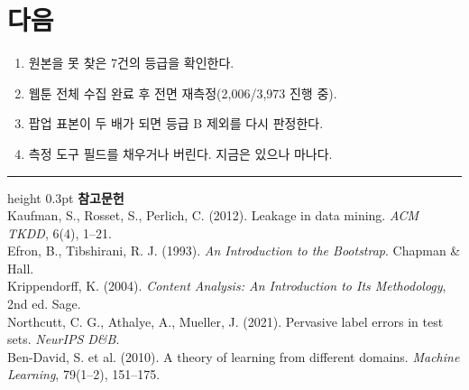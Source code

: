 \documentclass[10pt]{article}
\begin{document}
\section{다음}

\begin{enumerate}[leftmargin=1.3em,itemsep=0.15em]
\item 원본을 못 찾은 7건의 등급을 확인한다.
\item 웹툰 전체 수집 완료 후 전면 재측정(2,006/3,973 진행 중).
\item 팝업 표본이 두 배가 되면 등급 B 제외를 다시 판정한다.
\item 측정 도구 필드를 채우거나 버린다. 지금은 있으나 마나다.
\end{enumerate}

\vspace{0.6em}
\hrule height 0.3pt
\vspace{0.5em}
{\footnotesize
\textbf{참고문헌}\\[0.3em]
Kaufman, S., Rosset, S., Perlich, C. (2012). Leakage in data mining.
\emph{ACM TKDD}, 6(4), 1--21.\\[0.15em]
Efron, B., Tibshirani, R. J. (1993). \emph{An Introduction to the Bootstrap}.
Chapman \& Hall.\\[0.15em]
Krippendorff, K. (2004). \emph{Content Analysis: An Introduction to Its
Methodology}, 2nd ed. Sage.\\[0.15em]
Northcutt, C. G., Athalye, A., Mueller, J. (2021). Pervasive label errors in test
sets. \emph{NeurIPS D\&B}.\\[0.15em]
Ben-David, S. et al. (2010). A theory of learning from different domains.
\emph{Machine Learning}, 79(1--2), 151--175.
}
\end{document}
